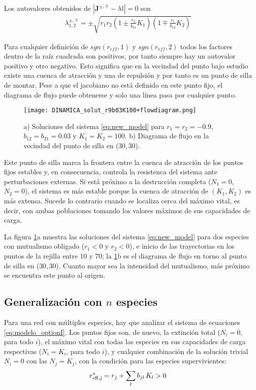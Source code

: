 Los autovalores obtenidos de $\left| \mathbf{J}^{\pm,\mp}-\lambda\mathbb{I}  \right|=0$ son
\begin{align*}
  \lambda^{\pm,\mp}_{1,2}= \pm \sqrt{r_1 r_2 \left(1\pm\frac{r_2}{b_{21}}K_1 \right)\left(1\mp\frac{r_1}{b_{12}}K_2 \right)}
\end{align*}

Para cualquier definición de $sgn(r_{eff},1)$ y $sgn(r_{eff},2)$ todos los factores dentro de la raíz cuadrada son positivos, por tanto siempre hay un autovalor positivo y otro negativo. Esto significa que en la vecindad del punto bajo estudio existe una cuenca de atracción y una de repulsión y por tanto es un punto de silla de montar. Pese a que el jacobiano no está definido en este punto fijo, el diagrama de flujo puede obtenerse y solo una línea pasa por cualquier punto.

\begin{figure}[h!]
\centering
\texttt{[image: DINAMICA\_solut\_r9b03K100+flowdiagram.png]}
\caption {a) Soluciones del sistema \ref{eq:new_model} para $r_1=r_2=-0.9$, $b_{12}=b_{21}=0.03$ y $K_1=K_2=100$. b) Diagrama de flujo en la vecindad del punto de silla en ($30,30$).}
\label{fig:stab1_phase}
\end{figure}

Este punto de silla marca la frontera entre la cuenca de atracción de los puntos fijos estables y, en consecuencia, controla la resistenca del sistema ante perturbaciones externas. Si está próximo a la destrucción completa ($N_1=0$,$N_2=0$), el sistema es más estable porque la cuenca de atracción de $(K_1,K_2)$ es más extensa. Sucede lo contrario cuando se localiza cerca del máximo vital, es decir, con ambas poblaciones tomando los valores máximos de sus capacidades de carga.

La figura \ref{fig:stab1_phase}a muestra las soluciones del sistema \ref{eq:new_model} para dos especies con mutualismo obligado ($r_1<0$ y $r_2<0$), e inicio de las trayectorias en los puntos de la rejilla entre $10$ y $70$; la \ref{fig:stab1_phase}b es el diagrama de flujo en torno al punto de silla en ($30,30$). Cuanto mayor sea la intensidad del mutualismo, más próximo se encuentra este punto al origen.


\subsection{Generalización con $n$ especies}

Para una red con múltiples especies, hay que analizar el sistema de ecuaciones \ref{eq:modelo_optionI}. Los puntos fijos son, de nuevo, la extinción total ($N_i=0$, para todo $i$), el máximo vital con todas las especies en sus capacidades de carga respectivas ($N_i=K_i$, para todo $i$), y cualquier combinación de la solución trivial $N_{i}=0$ con las $N_{j}= K_{j}$, con la condición para las especies supervivientes:
\begin{equation}
\displaystyle r_{\rm{eff},j}^{\ast} = r_{j} + \sum_{l} b_{jl}\, K_{l} > 0 \\
\label{eq:condit_reff_K}
\end{equation}


